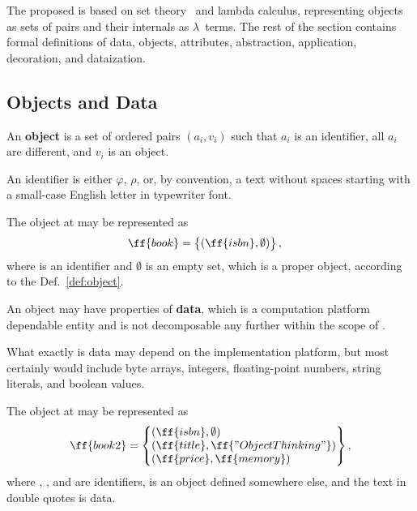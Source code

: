 The proposed \phic{} is based on set theory~\citep{jech2013set} and lambda calculus,
representing objects as sets of pairs and their internals as $\lambda$~terms.
The rest of the section contains formal definitions of
data, objects, attributes, abstraction, application, decoration, and dataization.

\subsection{Objects and Data}

\begin{eodefinition}\label{def:object}
An \textbf{object} is a set of ordered pairs $(a_i, v_i)$ such that
$a_i$ is an identifier, all $a_i$ are different, and $v_i$ is an object.
\end{eodefinition}

An identifier is either $\varphi$, $\rho$, or, by convention, a text without
spaces starting with a small-case English letter in typewriter font.

The object at  may be represented as
\begin{equation}\label{eq:book}
\begin{split}
\ff{book} & = \left\{\begin{matrix*}[l]
  (\ff{isbn}, \emptyset) \\
\end{matrix*}\right\},
\end{split}
\end{equation}
where  is an identifier and $\emptyset$ is an empty
set, which is a proper object, according to the Def.~\ref{def:object}.

\begin{eodefinition}\label{def:data}
An object may have properties of \textbf{data},
which is a computation platform dependable entity and is not
decomposable any further within the scope of \phic{}.
\end{eodefinition}

What exactly is data may depend on the
implementation platform, but most certainly would include
byte arrays, integers, floating-point numbers,
string literals, and boolean values.

The object at  may be represented as
\begin{equation}\label{eq:book2}
\begin{split}
\ff{book2} & = \left\{\begin{matrix*}[l]
  (\ff{isbn}, \emptyset) \\
  (\ff{title}, \ff{"Object Thinking"}) \\
  (\ff{price}, \ff{memory}) \\
\end{matrix*}\right\}, \\
\end{split}
\end{equation}
where , , and  are identifiers,
 is an object defined somewhere else,
and the text in double quotes is data.

